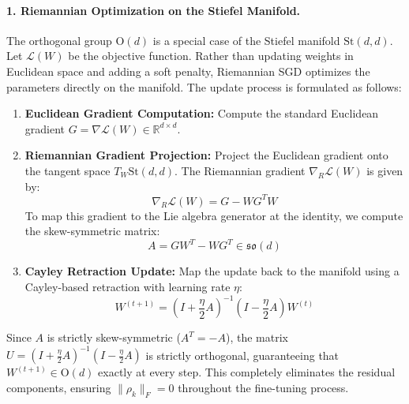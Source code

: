 \paragraph{1. Riemannian Optimization on the Stiefel Manifold.}
The orthogonal group $\mathrm{O}(d)$ is a special case of the Stiefel manifold $\mathrm{St}(d, d)$. Let $\mathcal{L}(W)$ be the objective function. Rather than updating weights in Euclidean space and adding a soft penalty, Riemannian SGD optimizes the parameters directly on the manifold. The update process is formulated as follows:
\begin{enumerate}
    \item \textbf{Euclidean Gradient Computation:} Compute the standard Euclidean gradient $G = \nabla \mathcal{L}(W) \in \mathbb{R}^{d \times d}$.
    \item \textbf{Riemannian Gradient Projection:} Project the Euclidean gradient onto the tangent space $T_W \mathrm{St}(d, d)$. The Riemannian gradient $\nabla_R \mathcal{L}(W)$ is given by:
    \begin{equation}
    \label{eq:riem_grad}
    \nabla_R \mathcal{L}(W) = G - W G^T W
    \end{equation}
    To map this gradient to the Lie algebra generator at the identity, we compute the skew-symmetric matrix:
    \begin{equation}
    A = G W^T - W G^T \in \mathfrak{so}(d)
    \end{equation}
    \item \textbf{Cayley Retraction Update:} Map the update back to the manifold using a Cayley-based retraction with learning rate $\eta$:
    \begin{equation}
    W^{(t+1)} = \left( I + \frac{\eta}{2} A \right)^{-1} \left( I - \frac{\eta}{2} A \right) W^{(t)}
    \end{equation}
\end{enumerate}
Since $A$ is strictly skew-symmetric ($A^T = -A$), the matrix $U = (I + \frac{\eta}{2} A)^{-1} (I - \frac{\eta}{2} A)$ is strictly orthogonal, guaranteeing that $W^{(t+1)} \in \mathrm{O}(d)$ exactly at every step. This completely eliminates the residual components, ensuring $\|\rho_k\|_F = 0$ throughout the fine-tuning process.

